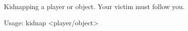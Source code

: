 Kidnapping a player or object.
Your victim must follow you.           

Usage: kidnap <player/object> 

